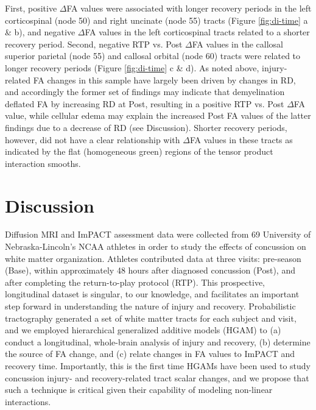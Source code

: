 \documentclass[12pt]{article}
\begin{document}
First, positive $\Delta$FA values were associated with longer recovery periods in the left corticospinal (node 50) and right uncinate (node 55) tracts (Figure \ref{fig:di-time} a \& b), and negative $\Delta$FA values in the left corticospinal tracts related to a shorter recovery period. Second, negative RTP vs. Post $\Delta$FA values in the callosal superior parietal (node 55) and callosal orbital (node 60) tracts were related to longer recovery periods (Figure \ref{fig:di-time} c \& d). As noted above, injury-related FA changes in this sample have largely been driven by changes in RD, and accordingly the former set of findings may indicate that demyelination deflated FA by increasing RD at Post, resulting in a positive RTP vs. Post $\Delta$FA value, while cellular edema may explain the increased Post FA values of the latter findings due to a decrease of RD (see Discussion). Shorter recovery periods, however, did not have a clear relationship with $\Delta$FA values in these tracts as indicated by the flat (homogeneous green) regions of the tensor product interaction smooths.


\section{Discussion}
\label{sec:disc}
Diffusion MRI and ImPACT assessment data were collected from 69 University of Nebraska-Lincoln's NCAA athletes in order to study the effects of concussion on white matter organization. Athletes contributed data at three visits: pre-season (Base), within approximately 48 hours after diagnosed concussion (Post), and after completing the return-to-play protocol (RTP). This prospective, longitudinal dataset is singular, to our knowledge, and facilitates an important step forward in understanding the nature of injury and recovery. Probabilistic tractography generated a set of white matter tracts for each subject and visit, and we employed hierarchical generalized additive models (HGAM) to (a) conduct a longitudinal, whole-brain analysis of injury and recovery, (b) determine the source of FA change, and (c) relate changes in FA values to ImPACT and recovery time. Importantly, this is the first time HGAMs have been used to study concussion injury- and recovery-related tract scalar changes, and we propose that such a technique is critical given their capability of modeling non-linear interactions.

\end{document}
